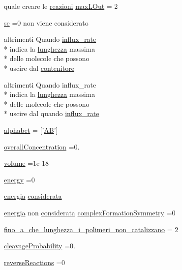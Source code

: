 \begin{DoxyCompactItemize}
quale creare le \hyperlink{a00071_a69962f56e60d0c88abc5d4b6839c2886}{reazioni} \hyperlink{a00071_abb126c97fed10420e64f85923bf5e04b}{max\-L\-Out} = 2
\item 
\hyperlink{a00071_a99032f27eaf45da350b544c68aa6467c}{se} =0 non viene considerato
\item 
altrimenti Quando \hyperlink{a00071_ad795c71664f3161dc8f7a769341daadf}{influx\-\_\-rate} \\*
indica la \hyperlink{a00064_a984d293145d85a936f430c0990316e51}{lunghezza} massima \\*
delle molecole che possono \\*
uscire dal \hyperlink{a00071_a8fcf98921930aa3720acdd081c5b0c2f}{contenitore}
\item 
altrimenti Quando influx\-\_\-rate \\*
indica la \hyperlink{a00064_a984d293145d85a936f430c0990316e51}{lunghezza} massima \\*
delle molecole che possono \\*
uscire dal quando \hyperlink{a00071_ad795c71664f3161dc8f7a769341daadf}{influx\-\_\-rate}
\item 
\hyperlink{a00071_abcbc32fc68e4323620d6171a17310212}{alphabet} = \mbox{[}'\hyperlink{a00069_abfef5bcdab19147dbfbb68112da17044}{A\-B}'\mbox{]}
\item 
\hyperlink{a00071_a59597688ed79473c0234f45eb9167574}{overall\-Concentration} =0.
\item 
\hyperlink{a00071_a9bc498ccac8db41438f855f5dd3f4c05}{volume} =1e-\/18
\item 
\hyperlink{a00071_ac002779c383d2cc783e881f94449de66}{energy} =0
\item 
\hyperlink{a00071_a15a0e3f3007df072a07460518322b944}{energia} \hyperlink{a00071_ad76697f83c5d8bf201c45822af227e21}{considerata}
\item 
\hyperlink{a00071_a15a0e3f3007df072a07460518322b944}{energia} non \hyperlink{a00071_ad76697f83c5d8bf201c45822af227e21}{considerata} \hyperlink{a00071_ac5d9cfec5453da5efc3e8d574b455833}{complex\-Formation\-Symmetry} =0
\item 
\hyperlink{a00071_ab6966d9ee620bc7376dc41a38352b948}{fino\-\_\-a\-\_\-che\-\_\-lunghezza\-\_\-i\-\_\-polimeri\-\_\-non\-\_\-catalizzano} = 2
\item 
\hyperlink{a00071_a9d512df05ee559766d2b8f08e4704b04}{cleavage\-Probability} =0.
\item 
\hyperlink{a00071_a650532b3a3c04865cc35cff6d567c5c0}{reverse\-Reactions} =0
\item 

\end{DoxyCompactItemize}

